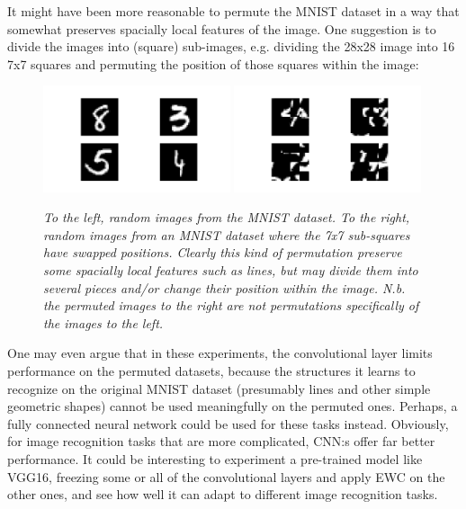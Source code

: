\documentclass{article}
\begin{document}
            It might have been more reasonable to permute the MNIST dataset in a way 
            that somewhat preserves spacially local features of the image. One 
            suggestion is to divide the images into (square) sub-images, e.g. 
            dividing the 28x28 image into 16 7x7 squares and permuting the 
            position of those squares within the image:

            \begin{figure}[H]
                \includegraphics[width=0.49\textwidth]{figures/regular_mnist.png}
                \includegraphics[width=0.49\textwidth]{figures/shuffled_mnist.png}
                \caption{\textit{To the left, random images from the MNIST dataset. 
                To the right, random images from an MNIST dataset where the 
                7x7 sub-squares have swapped positions. Clearly this kind of 
                permutation preserve some spacially local features such as lines,
                but may divide them into several pieces and/or change their 
                position within the image. N.b. the permuted images to the right 
                are not permutations specifically of the images to the left.}}
            \end{figure}

            One may even argue that in these experiments, the convolutional 
            layer limits performance on the permuted datasets, because the 
            structures it learns to recognize on the original MNIST dataset 
            (presumably lines and other simple geometric shapes) 
            cannot be used meaningfully on the permuted ones. 
            Perhaps, a fully connected neural network could be used for these 
            tasks instead. Obviously, for image recognition tasks that are more 
            complicated, CNN:s offer far better performance. It could be interesting  
            to experiment a pre-trained model like VGG16, freezing some or all of 
            the convolutional layers and apply EWC on the other ones, and see how 
            well it can adapt to different image recognition tasks.
\end{document}
